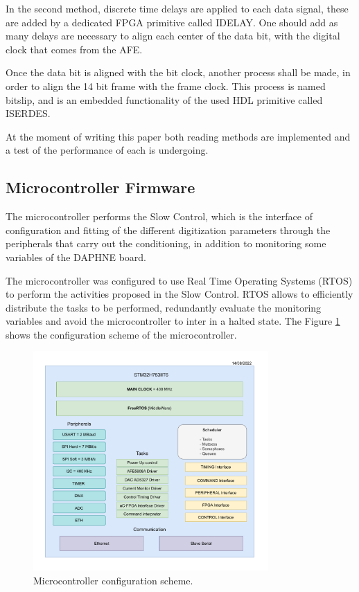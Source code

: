 In the second method, discrete time delays are applied to each data signal, these are added by a dedicated FPGA primitive called IDELAY. One should add as many delays are necessary to align each center of the data bit, with the digital clock that comes from the AFE.

Once the data bit is aligned with the bit clock, another process shall be made, in order to align the 14 bit frame with the frame clock. This process is named bitslip, and is an embedded functionality of the used HDL primitive called ISERDES.\cite{XILINX_Ref1:XAPP585,limitinganalog,semiconductor2009high}

At the moment of writing this paper both reading methods are implemented and a test of the performance of each is undergoing.


\subsection{Microcontroller Firmware}

The microcontroller performs the Slow Control, which is the interface of configuration and fitting of the different digitization parameters through the peripherals that carry out the conditioning, in addition to monitoring some variables of the DAPHNE board.

The microcontroller was configured to use Real Time Operating Systems (RTOS) to perform the activities proposed in the Slow Control. RTOS allows to efficiently distribute the tasks to be performed, redundantly evaluate the monitoring variables and avoid the microcontroller to inter in a halted state. The Figure \ref{fig:FirmwareMCU} shows the configuration scheme of the microcontroller.

\begin{figure}[htbp]
\centering %
\includegraphics[width=0.8\textwidth,origin=c,angle=0]{Images/FirmwareMCU.pdf}
\caption{\label{fig:FirmwareMCU} Microcontroller configuration scheme.}
\end{figure}

